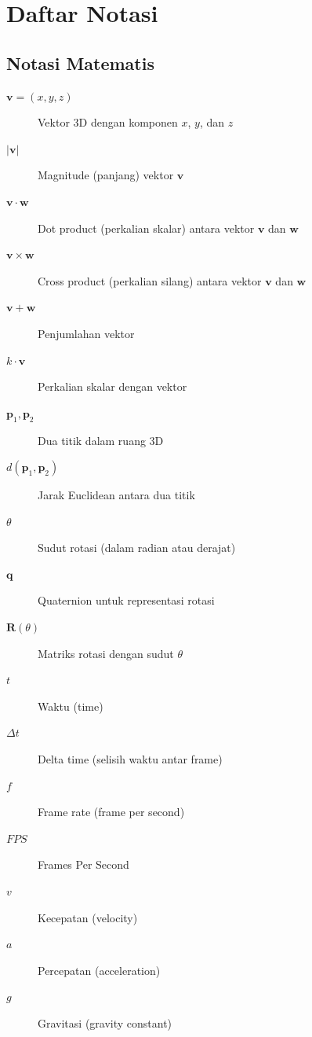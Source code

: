 
\section*{Daftar Notasi}

\subsection*{Notasi Matematis}

\begin{description}
    \item[$\mathbf{v} = (x, y, z)$] Vektor 3D dengan komponen $x$, $y$, dan $z$
    \item[$|\mathbf{v}|$] Magnitude (panjang) vektor $\mathbf{v}$
    \item[$\mathbf{v} \cdot \mathbf{w}$] Dot product (perkalian skalar) antara vektor $\mathbf{v}$ dan $\mathbf{w}$
    \item[$\mathbf{v} \times \mathbf{w}$] Cross product (perkalian silang) antara vektor $\mathbf{v}$ dan $\mathbf{w}$
    \item[$\mathbf{v} + \mathbf{w}$] Penjumlahan vektor
    \item[$k \cdot \mathbf{v}$] Perkalian skalar dengan vektor
    \item[$\mathbf{p}_1, \mathbf{p}_2$] Dua titik dalam ruang 3D
    \item[$d(\mathbf{p}_1, \mathbf{p}_2)$] Jarak Euclidean antara dua titik
    \item[$\theta$] Sudut rotasi (dalam radian atau derajat)
    \item[$\mathbf{q}$] Quaternion untuk representasi rotasi
    \item[$\mathbf{R}(\theta)$] Matriks rotasi dengan sudut $\theta$
    \item[$t$] Waktu (time)
    \item[$\Delta t$] Delta time (selisih waktu antar frame)
    \item[$f$] Frame rate (frame per second)
    \item[$FPS$] Frames Per Second
    \item[$v$] Kecepatan (velocity)
    \item[$a$] Percepatan (acceleration)
    \item[$g$] Gravitasi (gravity constant)

\end{description}
